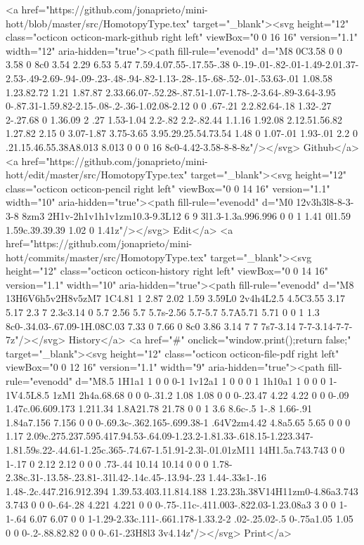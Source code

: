 {      <a href="https://github.com/jonaprieto/mini-hott/blob/master/src/HomotopyType.tex" target="_blank"><svg height="12" class="octicon octicon-mark-github right left" viewBox="0 0 16 16" version="1.1" width="12" aria-hidden="true"><path fill-rule="evenodd" d="M8 0C3.58 0 0 3.58 0 8c0 3.54 2.29 6.53 5.47 7.59.4.07.55-.17.55-.38 0-.19-.01-.82-.01-1.49-2.01.37-2.53-.49-2.69-.94-.09-.23-.48-.94-.82-1.13-.28-.15-.68-.52-.01-.53.63-.01 1.08.58 1.23.82.72 1.21 1.87.87 2.33.66.07-.52.28-.87.51-1.07-1.78-.2-3.64-.89-3.64-3.95 0-.87.31-1.59.82-2.15-.08-.2-.36-1.02.08-2.12 0 0 .67-.21 2.2.82.64-.18 1.32-.27 2-.27.68 0 1.36.09 2 .27 1.53-1.04 2.2-.82 2.2-.82.44 1.1.16 1.92.08 2.12.51.56.82 1.27.82 2.15 0 3.07-1.87 3.75-3.65 3.95.29.25.54.73.54 1.48 0 1.07-.01 1.93-.01 2.2 0 .21.15.46.55.38A8.013 8.013 0 0 0 16 8c0-4.42-3.58-8-8-8z"/></svg> Github</a>
      <a href="https://github.com/jonaprieto/mini-hott/edit/master/src/HomotopyType.tex" target="_blank"><svg height="12" class="octicon octicon-pencil right left" viewBox="0 0 14 16" version="1.1" width="10" aria-hidden="true"><path fill-rule="evenodd" d="M0 12v3h3l8-8-3-3-8 8zm3 2H1v-2h1v1h1v1zm10.3-9.3L12 6 9 3l1.3-1.3a.996.996 0 0 1 1.41 0l1.59 1.59c.39.39.39 1.02 0 1.41z"/></svg> Edit</a>
      <a href="https://github.com/jonaprieto/mini-hott/commits/master/src/HomotopyType.tex" target="_blank"><svg height="12" class="octicon octicon-history right left" viewBox="0 0 14 16" version="1.1" width="10" aria-hidden="true"><path fill-rule="evenodd" d="M8 13H6V6h5v2H8v5zM7 1C4.81 1 2.87 2.02 1.59 3.59L0 2v4h4L2.5 4.5C3.55 3.17 5.17 2.3 7 2.3c3.14 0 5.7 2.56 5.7 5.7s-2.56 5.7-5.7 5.7A5.71 5.71 0 0 1 1.3 8c0-.34.03-.67.09-1H.08C.03 7.33 0 7.66 0 8c0 3.86 3.14 7 7 7s7-3.14 7-7-3.14-7-7-7z"/></svg> History</a>
      <a  href="#" onclick="window.print();return false;" target="_blank"><svg height="12" class="octicon octicon-file-pdf right left" viewBox="0 0 12 16" version="1.1" width="9" aria-hidden="true"><path fill-rule="evenodd" d="M8.5 1H1a1 1 0 0 0-1 1v12a1 1 0 0 0 1 1h10a1 1 0 0 0 1-1V4.5L8.5 1zM1 2h4a.68.68 0 0 0-.31.2 1.08 1.08 0 0 0-.23.47 4.22 4.22 0 0 0-.09 1.47c.06.609.173 1.211.34 1.8A21.78 21.78 0 0 1 3.6 8.6c-.5 1-.8 1.66-.91 1.84a7.156 7.156 0 0 0-.69.3c-.362.165-.699.38-1 .64V2zm4.42 4.8a5.65 5.65 0 0 0 1.17 2.09c.275.237.595.417.94.53-.64.09-1.23.2-1.81.33-.618.15-1.223.347-1.81.59s.22-.44.61-1.25c.365-.74.67-1.51.91-2.3l-.01.01zM11 14H1.5a.743.743 0 0 1-.17 0 2.12 2.12 0 0 0 .73-.44 10.14 10.14 0 0 0 1.78-2.38c.31-.13.58-.23.81-.31l.42-.14c.45-.13.94-.23 1.44-.33s1-.16 1.48-.2c.447.216.912.394 1.39.53.403.11.814.188 1.23.23h.38V14H11zm0-4.86a3.743 3.743 0 0 0-.64-.28 4.221 4.221 0 0 0-.75-.11c-.411.003-.822.03-1.23.08a3 3 0 0 1-1-.64 6.07 6.07 0 0 1-1.29-2.33c.111-.661.178-1.33.2-2 .02-.25.02-.5 0-.75a1.05 1.05 0 0 0-.2-.88.82.82 0 0 0-.61-.23H8l3 3v4.14z"/></svg> Print</a>
}
